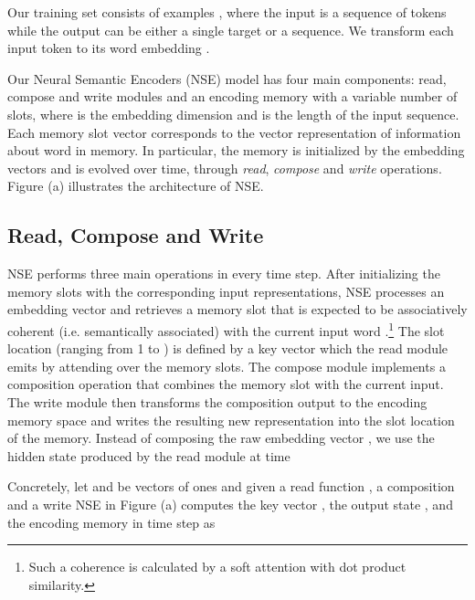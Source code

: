\documentclass{article}
\begin{document}
Our training set consists of  examples , where the input  is a sequence  of tokens while the output  can be either a single target or a sequence. We transform each input token  to its word embedding .

Our Neural Semantic Encoders (NSE) model has four main components: read, compose and write modules and an encoding memory  with a variable number of slots, where  is the embedding dimension and  is the length of the input sequence. Each memory slot vector  corresponds to the vector representation of information about word  in memory. In particular, the memory is initialized by the embedding vectors  and is evolved over time, through \textit{read}, \textit{compose} and \textit{write} operations. Figure  (a) illustrates the architecture of NSE.

\subsection{Read, Compose and Write}

NSE performs three main operations in every time step. After initializing the memory slots with the corresponding input representations, NSE processes an embedding vector  and retrieves a memory slot  that is expected to be associatively coherent (i.e. semantically associated) with the current input word .\footnote{Such a coherence is calculated by a soft attention with dot product similarity.} The slot location  (ranging from 1 to ) is defined by a key vector  which the read module emits by attending over the memory slots. The compose module implements a composition operation that combines the memory slot with the current input. The write module then transforms the composition output to the encoding memory space and writes the resulting new representation into the slot location of the memory. Instead of composing the raw embedding vector , we use the hidden state  produced by the read module at time 

Concretely, let  and  be vectors of ones and given a read function , a composition  and a write  NSE in Figure  (a) computes the key vector , the output state , and the encoding memory  in time step  as
\end{document}
